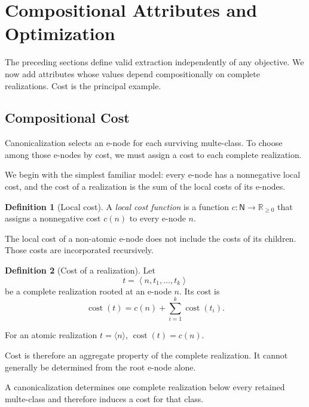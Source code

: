 \documentclass[sigconf,nonacm]{acmart}
\theoremstyle{definition}
\newtheorem{definition}{Definition}[section]
\theoremstyle{plain}
\theoremstyle{remark}
\begin{document}
\section{Compositional Attributes and Optimization}
\label{sec:optimization}

The preceding sections define valid extraction independently of any
objective.  We now add attributes whose values depend compositionally
on complete realizations.  Cost is the principal example.

\subsection{Compositional Cost}
\label{sec:compositional-cost}

Canonicalization selects an e-node for each surviving multe-class.
To choose among those e-nodes by cost, we must assign a cost to each
complete realization.

We begin with the simplest familiar model: every e-node has a
nonnegative local cost, and the cost of a realization is the sum of the
local costs of its e-nodes.

\begin{definition}[Local cost]
A \emph{local cost function} is a function
\(c:\mathsf N\to\mathbb R_{\geq 0}\)
that assigns a nonnegative cost \(c(n)\) to every e-node \(n\).
\end{definition}

The local cost of a non-atomic e-node does not include the costs of its
children.  Those costs are incorporated recursively.

\begin{definition}[Cost of a realization]
Let
\[
t=
\left\langle
n,t_1,\ldots,t_k
\right\rangle
\]
be a complete realization rooted at an e-node \(n\).
Its cost is
\[
\operatorname{cost}(t)
=
c(n)
+
\sum_{i=1}^{k}\operatorname{cost}(t_i).
\]

For an atomic realization \(t=\langle n\rangle\),
\(\operatorname{cost}(t)=c(n)\).
\end{definition}

Cost is therefore an aggregate property of the complete realization.
It cannot generally be determined from the root e-node alone.

A canonicalization determines one complete realization below every
retained multe-class and therefore induces a cost for that class.
\end{document}
